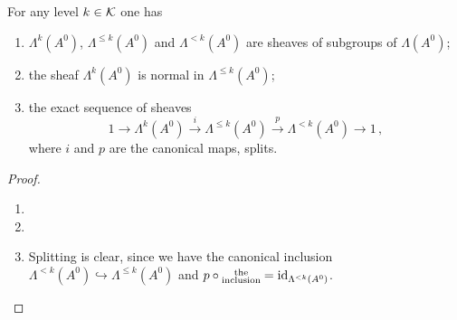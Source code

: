 \begin{comment}
  See \cite[I.5]{Loday1994} on p.\ 861f (See [LR91])
\end{comment}
\begin{prop}
  For any level $k\in\mathcal{K}$ one has
  \begin{enumerate}
    \item $\Lambda^{k}(A^0)$, $\Lambda^{\leq k}(A^0)$ and $\Lambda^{<k}(A^0)$
      are sheaves of subgroups of $\Lambda(A^0)$;
    \item the sheaf $\Lambda^k(A^0)$ is normal in $\Lambda^{\leq k}(A^0)$;
      \begin{comment}
        A subgroup $N$ is normal in $G$ ($N\vartriangleleft G$) if it is stable
        under conjugation, i.e.
        \[
          N\vartriangleleft G \Leftrightarrow \forall n\in N \forall g\in G,
          gng^{-1}\in N ,.
        \]
      \end{comment}
    \item the exact sequence of sheaves
      \[
        1\longrightarrow\Lambda^k(A^0)
        \overset{i}\longrightarrow\Lambda^{\leq k}(A^0)
        \overset{p}\longrightarrow\Lambda^{<k}(A^0)
        \longrightarrow 1 \,,
      \]
      where $i$ and $p$ are the canonical maps, splits.
  \end{enumerate}
\end{prop}
\begin{proof}
  \begin{enumerate}
    \item \TODO{}
    \item \TODO{}
    \item Splitting is clear, since we have the canonical inclusion
      $\Lambda^{<k}(A^0)\hookrightarrow\Lambda^{\leq k}(A^0)$ and
      $p\circ\substack{\text{the}\\\text{inclusion}}=\operatorname{id}_{\Lambda^{<k}(A^0)}$.
  \end{enumerate}
\end{proof}
